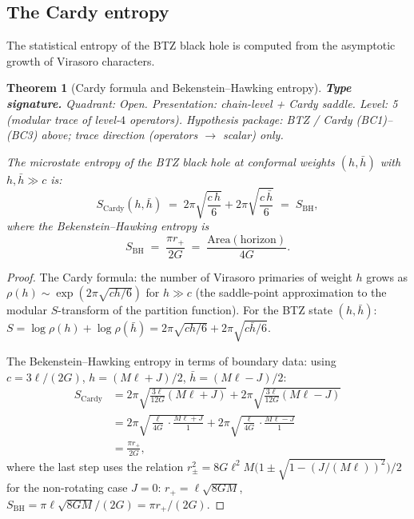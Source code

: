 \documentclass[11pt,reqno]{amsart}
\newtheorem{theorem}{Theorem}[section]
\theoremstyle{definition}
\theoremstyle{remark}
\begin{document}
\subsection{The Cardy entropy}

The statistical entropy of the BTZ black hole is computed from
the asymptotic growth of Virasoro characters.

\begin{theorem}[Cardy formula and Bekenstein--Hawking entropy]
\label{thm:cardy-bh}
\textbf{Type signature.} Quadrant: Open.
Presentation: chain-level + Cardy saddle.
Level: 5 (modular trace of level-$4$ operators).
Hypothesis package: BTZ / Cardy (BC1)--(BC3) above; trace
direction (operators $\to$ scalar) only.

The microstate entropy of the BTZ black hole at conformal weights
$(h, \bar{h})$ with $h, \bar{h} \gg c$ is:
\begin{equation}\label{eq:cardy}
S_{\mathrm{Cardy}}(h, \bar{h})
\;=\;
2\pi\sqrt{\frac{c\,h}{6}}
+ 2\pi\sqrt{\frac{c\,\bar{h}}{6}}
\;=\;
S_{\mathrm{BH}},
\end{equation}
where the Bekenstein--Hawking entropy is
\begin{equation}\label{eq:bekenstein-hawking}
S_{\mathrm{BH}}
\;=\;
\frac{\pi r_+}{2G}
\;=\;
\frac{\mathrm{Area}(\mathrm{horizon})}{4G}.
\end{equation}
\end{theorem}

\begin{proof}
The Cardy formula: the number of Virasoro primaries of weight $h$
grows as $\rho(h) \sim \exp(2\pi\sqrt{ch/6})$ for $h \gg c$
(the saddle-point approximation to the modular $S$-transform of
the partition function). For the BTZ state $(h, \bar{h})$:
$S = \log\rho(h) + \log\rho(\bar{h})
= 2\pi\sqrt{ch/6} + 2\pi\sqrt{c\bar{h}/6}$.

The Bekenstein--Hawking entropy in terms of boundary data:
using $c = 3\ell/(2G)$, $h = (M\ell + J)/2$,
$\bar{h} = (M\ell - J)/2$:
\begin{align*}
S_{\mathrm{Cardy}}
&= 2\pi\sqrt{\frac{3\ell}{12G}(M\ell + J)}
 + 2\pi\sqrt{\frac{3\ell}{12G}(M\ell - J)} \\[4pt]
&= 2\pi\sqrt{\frac{\ell}{4G}\cdot\frac{M\ell + J}{1}}
 + 2\pi\sqrt{\frac{\ell}{4G}\cdot\frac{M\ell - J}{1}} \\[4pt]
&= \frac{\pi r_+}{2G},
\end{align*}
where the last step uses the relation
$r_\pm^2 = 8G\ell^2 M \bigl(1 \pm \sqrt{1-(J/(M\ell))^2}\bigr)/2$
for the non-rotating case $J = 0$:
$r_+ = \ell\sqrt{8GM}$,
$S_{\mathrm{BH}} = \pi\ell\sqrt{8GM}/(2G)
= \pi r_+/(2G)$.
\end{proof}
\end{document}
